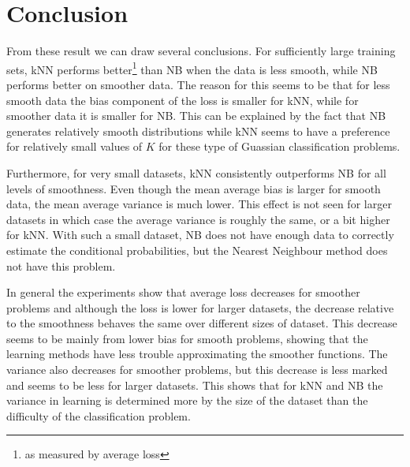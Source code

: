 \documentclass[a4paper]{article}
\begin{document}
\section{Conclusion}


From these result we can draw several conclusions. For sufficiently large training sets, \ac{kNN} performs better\footnote{as measured by average loss} than \ac{NB} when the data is less smooth, while \ac{NB} performs better on smoother data. The reason for this seems to be that for less smooth data the bias component of the loss is smaller for \ac{kNN}, while for smoother data it is smaller for \ac{NB}. This can be explained by the fact that \ac{NB} generates relatively smooth distributions while \ac{kNN} seems to have a preference for relatively small values of $K$ for these type of Guassian classification problems.

Furthermore, for very small datasets, \ac{kNN} consistently outperforms \ac{NB} for all levels of smoothness. Even though the mean average bias is larger for smooth data, the mean average variance is much lower. This effect is not seen for larger datasets in which case the average variance is roughly the same, or a bit higher for \ac{kNN}. With such a small dataset, \ac{NB} does not have enough data to correctly estimate the conditional probabilities, but the Nearest Neighbour method does not have this problem.

In general the experiments show that average loss decreases for smoother problems and although the loss is lower for larger datasets, the decrease relative to the smoothness behaves the same over different sizes of dataset. This decrease seems to be mainly from lower bias for smooth problems, showing that the learning methods have less trouble approximating the smoother functions. The variance also decreases for smoother problems, but this decrease is less marked and seems to be less for larger datasets. This shows that for \ac{kNN} and \ac{NB} the variance in learning is determined more by the size of the dataset than the difficulty of the classification problem.



\end{document}
